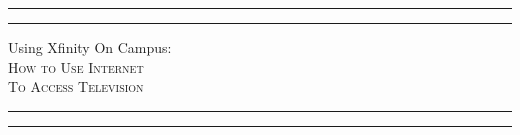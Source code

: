 \documentclass[a4paper, 11pt]{article}
\begin{document}


\begin{titlepage} %

	\centering %
	
	\scshape %
	
	\vspace*{\baselineskip} %
	
	
	\rule{\textwidth}{1.6pt}\vspace*{-\baselineskip}\vspace*{2pt} %
	\rule{\textwidth}{0.4pt} %
	
	\vspace{0.75\baselineskip} %
	
	{\LARGE Using Xfinity On Campus:\\} %
	\vspace{0.5\baselineskip} %
  {\scshape How to Use Internet \\ To Access Television}
	
	\vspace{0.75\baselineskip} %
	
	\rule{\textwidth}{0.4pt}\vspace*{-\baselineskip}\vspace{3.2pt} %
	\rule{\textwidth}{1.6pt} %
	
	\vspace{2\baselineskip} %
	
	
	
	\vspace*{3\baselineskip} %
	
	
	\vspace{0.5\baselineskip} %
	
	\vspace{0.5\baselineskip} %
	

\end{titlepage}
\end{document}

